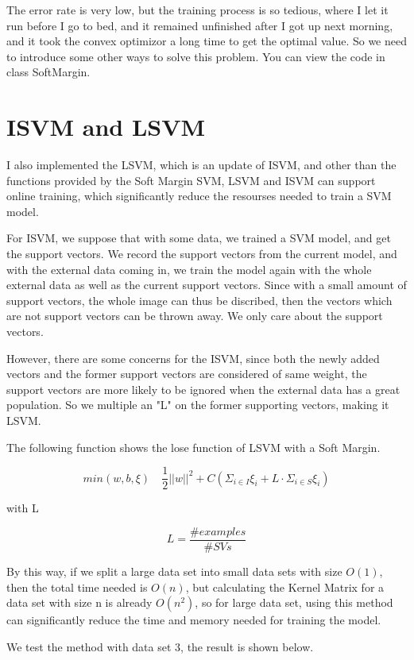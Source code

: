 \documentclass[12pt]{article}
\begin{document}
The error rate is very low, but the training process is so tedious, where I let it run before I go to bed, and it remained unfinished after I got up next morning, and it took the convex optimizor a long time to get the optimal value. So we need to introduce some other ways to solve this problem. You can view the code in class SoftMargin.

\section{ISVM and LSVM}

\qquad I also implemented the LSVM, which is an update of ISVM, and other than the functions provided by the Soft Margin SVM, LSVM and ISVM can support online training, which significantly reduce the resourses needed to train a SVM model.

For ISVM, we suppose that with some data, we trained a SVM model, and get the support vectors. We record the support vectors from the current model, and with the external data coming in, we train the model again with the whole external data as well as the current support vectors. Since with a small amount of support vectors, the whole image can thus be discribed, then the vectors which are not support vectors can be thrown away. We only care about the support vectors.

However, there are some concerns for the ISVM, since both the newly added vectors and the former support vectors are considered of same weight, the support vectors are more likely to be ignored when the external data has a great population. So we multiple an "L" on the former supporting vectors, making it LSVM.

The following function shows the lose function of LSVM with a Soft Margin.

$$
min(w, b, \xi)\quad \frac{1}{2}||w||^2 + C(\Sigma_{i\in I}\xi_i + L \cdot \Sigma_{i\in S}\xi_i)
$$

with L

$$
L = \frac{\# examples}{\# SVs}
$$

By this way, if we split a large data set into small data sets with size $O(1)$, then the total time needed is $O(n)$, but calculating the Kernel Matrix for a data set with size n is already $O(n^2)$, so for large data set, using this method can significantly reduce the time and memory needed for training the model.

We test the method with data set 3, the result is shown below.
\end{document}
